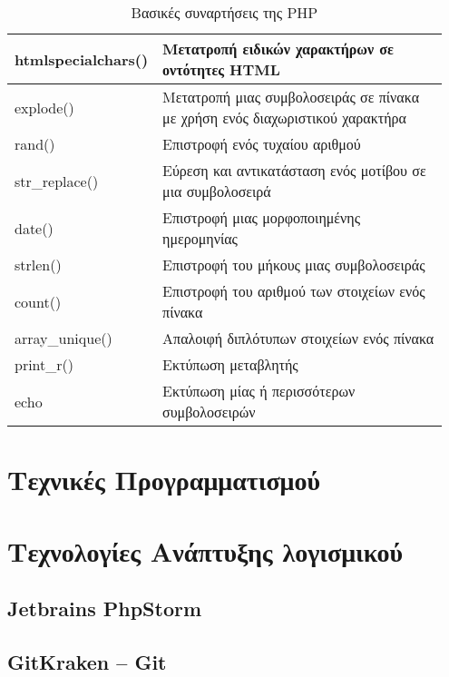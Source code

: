 \begin{table}[h]
\caption{Βασικές συναρτήσεις της PHP}
\label{tbl:php_basic_functions}
\begin{tabular}{|p{0.2\linewidth}|p{0.75\linewidth}|}
\hline
htmlspecialchars() & Μετατροπή ειδικών χαρακτήρων σε οντότητες HTML                               \\ \hline
explode()          & Μετατροπή μιας συμβολοσειράς σε πίνακα με χρήση ενός διαχωριστικού χαρακτήρα \\ \hline
rand()             & Επιστροφή ενός τυχαίου αριθμού                                               \\ \hline
str\_replace()     & Εύρεση και αντικατάσταση ενός μοτίβου σε μια συμβολοσειρά                    \\ \hline
date()             & Επιστροφή μιας μορφοποιημένης ημερομηνίας                                    \\ \hline
strlen()           & Επιστροφή του μήκους μιας συμβολοσειράς                                      \\ \hline
count()            & Επιστροφή του αριθμού των στοιχείων ενός πίνακα                              \\ \hline
array\_unique()    & Απαλοιφή διπλότυπων στοιχείων ενός πίνακα                                    \\ \hline
print\_r()         & Εκτύπωση μεταβλητής                                                          \\ \hline
echo               & Εκτύπωση μίας ή περισσότερων συμβολοσειρών                                   \\ \hline
\end{tabular}
\end{table}

\section{Τεχνικές Προγραμματισμού}

\section{Τεχνολογίες Ανάπτυξης λογισμικού}

\subsection{Jetbrains PhpStorm}

\subsection{GitKraken – Git}
